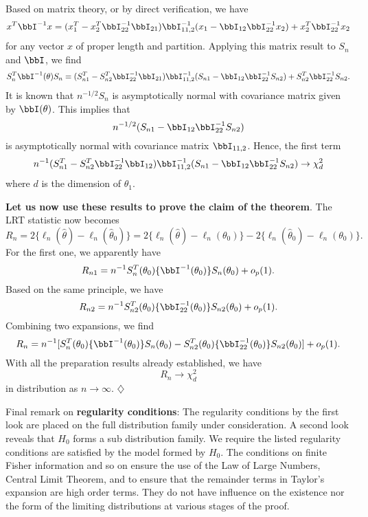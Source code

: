 Based on matrix theory, or by direct verification, we have
\[
x^T \bbI^{-1} x  
= (x^T_1- x_2^T \bbI_{22}^{-1} \bbI_{21}) \bbI^{-1}_{11,2}  (x_1- \bbI_{12} \bbI^{-1}_{22} x_2) 
+ x^T_2 \bbI_{22}^{-1} x_2 
\]
for any vector $x$ of proper length and partition.
Applying this matrix result to $S_n$ and $\bbI$, we find
\[
S_n^T \bbI^{-1}(\theta) S_n=
(S^T_{n1} - S^T_{n2}\bbI_{22}^{-1} \bbI_{21}) \bbI_{11,2}^{-1} (S_{n1} -\bbI_{12} \bbI^{-1}_{22} S_{n2})
+
S^T_{n2} \bbI_{22}^{-1} S_{n2}.
\]
It is known that $n^{-1/2}S_n$ is asymptotically normal with covariance matrix
given by $\bbI(\theta)$. This implies that
\[
n^{-1/2} (S_{n1} -\bbI_{12} \bbI^{-1}_{22} S_{n2})
\]
is asymptotically normal with covariance matrix
$\bbI_{11,2}$.
Hence, the first term
\[
n^{-1}(S^T_{n1} - S^T_{n2}\bbI_{22}^{-1} \bbI_{12}) \bbI_{11,2}^{-1} (S_{n1} -\bbI_{12} \bbI^{-1}_{22} S_{n2})
\to 
\chi_d^2
\]
where $d$ is the dimension of $\theta_1$.

\vs
\noindent
{\bf Let us now use these results to prove the claim of the theorem}.
The LRT statistic now becomes
\[
R_n 
= 2 \{ \ell_n(\hat \theta) - \ell_n(\hat \theta_0)\}
= 2 \{ \ell_n(\hat \theta) - \ell_n( \theta_0)\}
-
2 \{ \ell_n(\hat \theta_0) - \ell_n(\theta_0)\}.
\]
For the first one, we apparently have
\[
R_{n1}
= n^{-1} S_n^T(\theta_0) \{\bbI^{-1}(\theta_0)\} S_n( \theta_0 )  + o_p(1).
\]
Based on the same principle, we have
\[
R_{n2}
=
n^{-1} S_{n2}^T(\theta_0) \{\bbI^{-1}_{22}(\theta_0)\} S_{n2}( \theta_0 )+ o_p(1).
\]
Combining two expansions, we find
\[
R_n
=
n^{-1} [
S_n^T(\theta_0) \{\bbI^{-1}(\theta_0)\}S_n( \theta_0 )
-
S_{n2}^T(\theta_0) \{\bbI^{-1}_{22}(\theta_0)\} S_{n2}( \theta_0 )]
+
o_p(1).
\]
With all the preparation results already established, we have
\[
R_n \to \chi_d^2
\]
in distribution as $n \to \infty$.
\hfill{$\diamondsuit$}

\vs
Final remark on {\bf regularity conditions}:
The regularity conditions by the first look are placed on
the full distribution family under consideration. 
A second look reveals that $H_0$
forms a sub distribution family. We require the
listed regularity conditions are satisfied by
the model formed by $H_0$.
The conditions on finite Fisher information and so on ensure
the use of the Law of Large Numbers, Central Limit Theorem,
and to ensure that the remainder terms in Taylor's expansion
are high order terms. They do not have influence on the
existence nor the form of the limiting distributions at various stages of
the proof.



